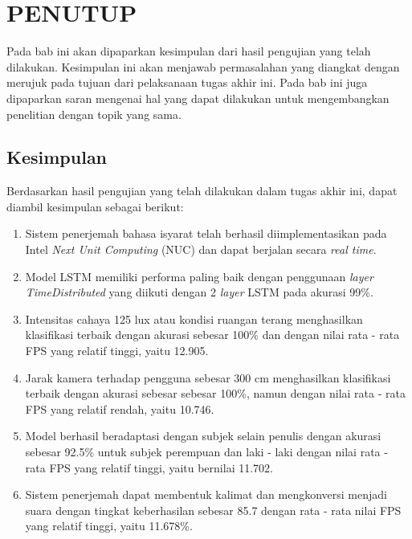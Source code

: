 \chapter{PENUTUP}
\label{chap:penutup}

Pada bab ini akan dipaparkan kesimpulan dari hasil pengujian yang telah dilakukan. Kesimpulan ini akan menjawab permasalahan yang diangkat dengan merujuk pada tujuan dari pelaksanaan tugas akhir ini. Pada bab ini juga dipaparkan saran mengenai hal yang dapat dilakukan untuk mengembangkan penelitian dengan topik yang sama.

\section{Kesimpulan}
\label{sec:kesimpulan}

Berdasarkan hasil pengujian yang telah dilakukan dalam tugas akhir ini, dapat diambil kesimpulan sebagai berikut:

\begin{enumerate}[nolistsep]
  
  \item Sistem penerjemah bahasa isyarat telah berhasil diimplementasikan pada Intel \emph{Next Unit Computing} (NUC) dan dapat berjalan secara \emph{real time}. 
  \item Model LSTM memiliki performa paling baik dengan penggunaan \emph{layer TimeDistributed} yang diikuti dengan 2 \emph{layer} LSTM pada akurasi 99\%.
  \item Intensitas cahaya 125 lux atau kondisi ruangan terang menghasilkan klasifikasi terbaik dengan akurasi sebesar 100\% dan dengan nilai rata - rata FPS yang relatif tinggi, yaitu 12.905.
  \item Jarak kamera terhadap pengguna sebesar 300 cm menghasilkan klasifikasi terbaik dengan akurasi sebesar sebesar 100\%, namun dengan nilai rata - rata FPS yang relatif rendah, yaitu 10.746.
  \item Model berhasil beradaptasi dengan subjek selain penulis dengan akurasi sebesar 92.5\% untuk subjek perempuan dan laki - laki dengan nilai rata - rata FPS yang relatif tinggi, yaitu bernilai 11.702.
  \item Sistem penerjemah dapat membentuk kalimat dan mengkonversi menjadi suara dengan tingkat keberhasilan sebesar 85.7 dengan rata - rata nilai FPS yang relatif tinggi, yaitu 11.678\%.

\end{enumerate}

